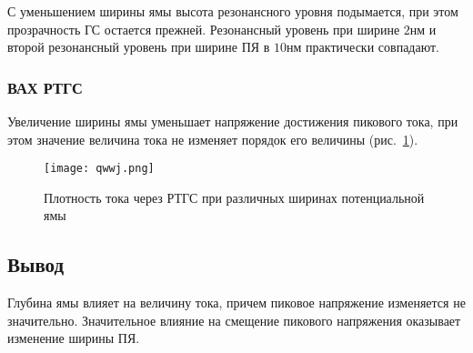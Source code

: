 С уменьшением ширины ямы высота резонансного уровня подымается, при этом прозрачность ГС остается прежней. Резонансный уровень при ширине $2$нм и второй резонансный уровень при ширине ПЯ в $10$нм практически совпадают. 
\subsubsection{ВАХ РТГС}
Увеличение ширины ямы уменьшает напряжение достижения пикового тока, при этом значение величина тока не изменяет порядок его величины (рис.~\ref{fig:qwwj}).

\begin{figure}[h!]
	\centering
	\texttt{[image: qwwj.png]}
	\caption{Плотность тока через РТГС при различных ширинах потенциальной ямы}
	\label{fig:qwwj}
\end{figure}

\subsection{Вывод}

Глубина ямы влияет на величину тока, причем пиковое напряжение изменяется не значительно. Значительное влияние на смещение пикового напряжения оказывает изменение ширины ПЯ.